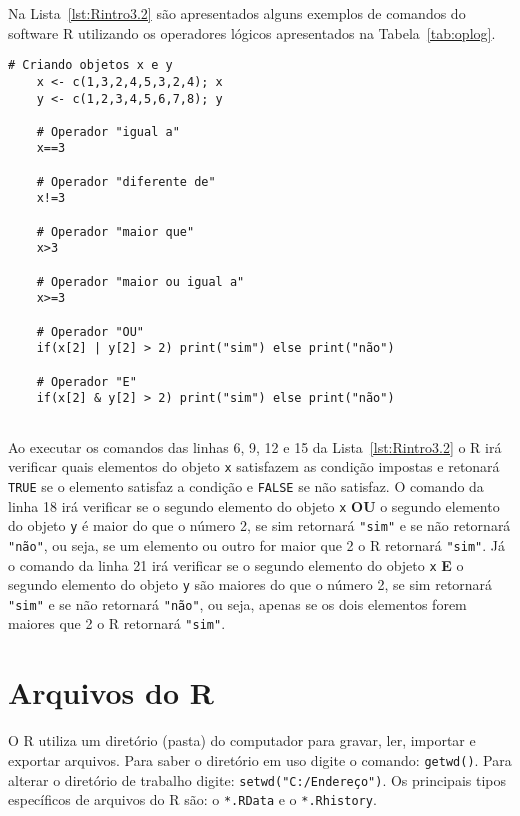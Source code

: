 \documentclass[11pt,fleqn]{book} %
\begin{document}
Na Lista~\ref{lst:Rintro3.2} são apresentados alguns exemplos de comandos do software R utilizando os operadores lógicos apresentados na Tabela~\ref{tab:oplog}. \\

\begin{scriptsize}
	\estiloR
	\begin{lstlisting}[caption={Comandos do software R}, label=lst:Rintro3.2]
	# Criando objetos x e y
	x <- c(1,3,2,4,5,3,2,4); x
	y <- c(1,2,3,4,5,6,7,8); y
	
	# Operador "igual a"
	x==3 
	
	# Operador "diferente de"
	x!=3
	
	# Operador "maior que"
	x>3 
	
	# Operador "maior ou igual a"
	x>=3 
	
	# Operador "OU"
	if(x[2] | y[2] > 2) print("sim") else print("não")
	
	# Operador "E"	
	if(x[2] & y[2] > 2) print("sim") else print("não")
	
	\end{lstlisting}
\end{scriptsize}

Ao executar os comandos das linhas 6, 9, 12 e 15 da Lista~\ref{lst:Rintro3.2} o R irá verificar quais elementos do objeto \texttt{x} satisfazem as condição impostas e retonará \texttt{TRUE} se o elemento satisfaz a condição e \texttt{FALSE} se não satisfaz. O comando da linha 18 irá verificar se o segundo elemento do objeto \texttt{x} {\bf OU} o segundo elemento do objeto \texttt{y} é maior do que o número 2, se sim retornará \texttt{"sim"} e se não retornará \texttt{"não"}, ou seja, se um elemento ou outro for maior que 2 o R retornará \texttt{"sim"}. Já o comando da linha 21 irá verificar se o segundo elemento do objeto \texttt{x} {\bf E} o segundo elemento do objeto \texttt{y} são maiores do que o número 2, se sim retornará \texttt{"sim"} e se não retornará \texttt{"não"}, ou seja, apenas se os dois elementos forem maiores que 2 o R retornará \texttt{"sim"}.



\section{Arquivos do R}

O R utiliza um diretório (pasta) do computador para gravar, ler, importar e exportar arquivos. Para saber o diretório em uso digite o comando: \texttt{getwd()}. Para alterar o diretório de trabalho digite: \texttt{setwd("C:/Endereço")}. Os principais tipos específicos de arquivos do R são: o \texttt{*.RData} e o \texttt{*.Rhistory}. \\
\end{document}
